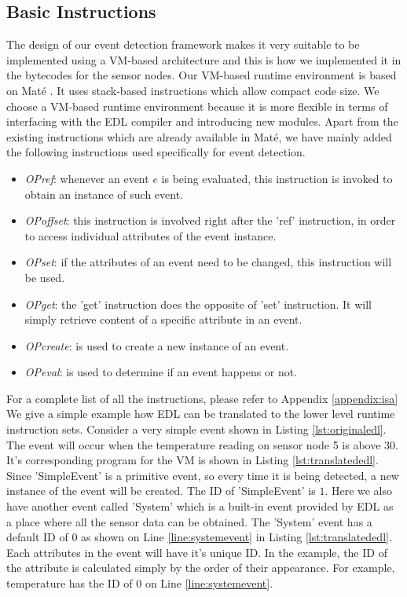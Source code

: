 \subsection{Basic Instructions}
The design of our event detection framework makes it very suitable to be implemented using a VM-based architecture and this is how we implemented it in the bytecodes for the sensor nodes. Our VM-based runtime environment is based on Mat\'{e} \cite{mate}. It uses stack-based instructions which allow compact code size. We choose a VM-based runtime environment because it is more flexible in terms of interfacing with the EDL compiler and introducing new modules. Apart from the existing instructions which are already available in Mat\'{e}, we have mainly added the following instructions used specifically for event detection.
\begin{itemize}
	\item \emph{OPref}: whenever an event \(e\) is being evaluated, this instruction is invoked to obtain an instance of such event.
	\item \emph{OPoffset}: this instruction is involved right after the 'ref' instruction, in order to access individual attributes of the event instance.
	\item \emph{OPset}: if the attributes of an event need to be changed, this instruction will be used.
	\item \emph{OPget}: the 'get' instruction does the opposite of 'set' instruction. It will simply retrieve content of a specific attribute in an event.
	\item \emph{OPcreate}: is used to create a new instance of an event.
	\item \emph{OPeval}: is used to determine if an event happens or not.
\end{itemize}
For a complete list of all the instructions, please refer to Appendix \ref{appendix:isa} We give a simple example how EDL can be translated to the lower level runtime instruction sets. Consider a very simple event shown in Listing \ref{lst:originaledl}. The event will occur when the temperature reading on sensor node 5 is above 30. It's corresponding program for the VM is shown in Listing \ref{lst:translatededl}. Since 'SimpleEvent' is a primitive event, so every time it is being detected, a new instance of the event will be created. The ID of 'SimpleEvent' is \(1\). Here we also have another event called 'System' which is a built-in event provided by EDL as a place where all the sensor data can be obtained. The 'System' event has a default ID of \(0\) as shown on Line \ref{line:systemevent} in Listing \ref{lst:translatededl}. Each attributes in the event will have it's unique ID. In the example, the ID of the attribute is calculated simply by the order of their appearance. For example, temperature has the ID of \(0\) on Line \ref{line:systemevent}.

